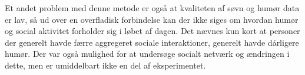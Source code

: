 Et andet problem med denne metode er også at kvaliteten af søvn og humør data er lav, så ud over en overfladisk forbindelse kan der ikke siges om hvordan humør og social aktivitet forholder sig i løbet af dagen.
Det nævnes kun kort at personer der generelt havde færre aggregeret sociale interaktioner, generelt havde dårligere humør.
Der var også mulighed for at undersøge socialt netværk og ændringen i dette, men er umiddelbart ikke en del af eksperimentet.
